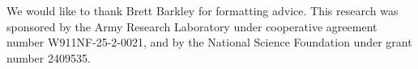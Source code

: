 \documentclass[runningheads]{llncs}
\begin{document}










\begin{credits}
\subsubsection{\ackname} We would like to thank Brett Barkley for formatting advice. This research was sponsored by the Army Research Laboratory under cooperative agreement number W911NF-25-2-0021, and by the National Science Foundation under grant number 2409535.

\end{credits}


\end{document}
